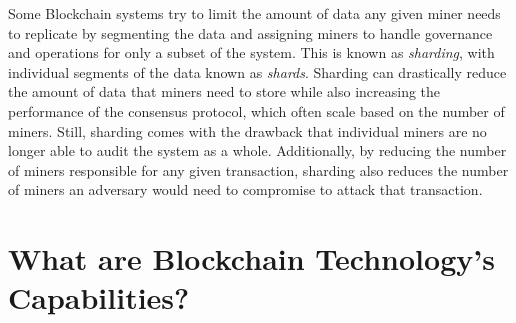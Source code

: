 

Some Blockchain systems try to limit the amount of data any given miner needs to replicate by segmenting the data and assigning miners to handle governance and operations for only a subset of the system.
This is known as \emph{sharding}, with individual segments of the data known as \emph{shards}.
Sharding can drastically reduce the amount of data that miners need to store while also increasing the performance of the consensus protocol, which often scale based on the number of miners.
Still, sharding comes with the drawback that individual miners are no longer 
able to audit the system as a whole.
Additionally, by reducing the number of miners responsible for any given transaction, sharding also reduces the number of miners an adversary would need to compromise to attack that transaction.

\section{What are Blockchain Technology's Capabilities?}
\label{sec:capabilities}

